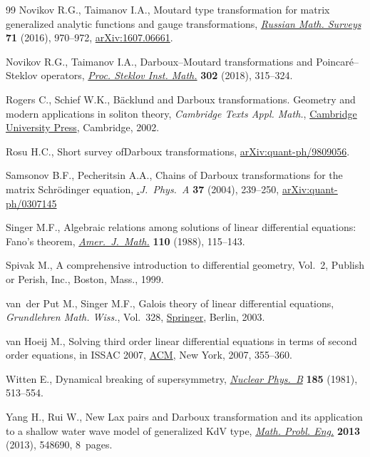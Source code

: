 \documentclass[pdftex]{sigma}%
\numberwithin{equation}{section}
\begin{document}
\begin{thebibliography}{99}
Novikov R.G., Taimanov I.A., {M}outard type transformation for matrix
 generalized analytic functions and gauge transformations, \href{https://doi.org/10.1070/RM9741}{\textit{Russian
 Math. Surveys}} \textbf{71} (2016), 970--972, \href{https://arxiv.org/abs/1607.06661}{arXiv:1607.06661}.

Novikov R.G., Taimanov I.A., Darboux--{M}outard transformations and
 {P}oincar\'e--{S}teklov operators, \href{https://doi.org/10.1134/S0081543818060160}{\textit{Proc. Steklov Inst. Math.}}
 \textbf{302} (2018), 315--324.

Rogers C., Schief W.K., B\"acklund and {D}arboux transformations. {G}eometry
 and modern applications in soliton theory, \textit{Cambridge Texts Appl. Math.}, \href{https://doi.org/10.1017/CBO9780511606359}{Cambridge University Press}, Cambridge, 2002.

Rosu H.C., Short survey of{D}arboux transformations, \href{https://arxiv.org/abs/quant-ph/9809056}{arXiv:quant-ph/9809056}.

Samsonov B.F., Pecheritsin A.A., Chains of {D}arboux transformations for the
 matrix {S}chr\"odinger equation, \href{https://doi.org/10.1088/0305-4470/37/1/016}.{\textit{J.~Phys.~A}} \textbf{37} (2004),
 239--250, \href{https://arxiv.org/abs/quant-ph/0307145}{arXiv:quant-ph/0307145}

Singer M.F., Algebraic relations among solutions of linear differential
 equations: {F}ano's theorem, \href{https://doi.org/10.2307/2374541}{\textit{Amer.~J.~Math.}} \textbf{110} (1988),
 115--143.

Spivak M., A comprehensive introduction to differential geometry, {V}ol.~2,
 Publish or Perish, Inc., Boston, Mass., 1999.

van~der Put M., Singer M.F., Galois theory of linear differential equations,
 \textit{Grundlehren Math. Wiss.}, Vol.~328, \href{https://doi.org/10.1007/978-3-642-55750-7}{Springer}, Berlin, 2003.

van Hoeij M., Solving third order linear differential equations in terms of
 second order equations, in I{SSAC} 2007, \href{https://doi.org/10.1145/1277548.1277596}{ACM}, New York, 2007, 355--360.

Witten E., Dynamical breaking of supersymmetry, \href{https://doi.org/10.1016/0550-3213(81)90006-7}{\textit{Nuclear Phys.~B}}
 \textbf{185} (1981), 513--554.

Yang H., Rui W., New {L}ax pairs and {D}arboux transformation and its
 application to a shallow water wave model of generalized {K}d{V} type,
 \href{https://doi.org/10.1155/2013/548690}{\textit{Math. Probl. Eng.}} \textbf{2013} (2013), 548690, 8~pages.

\end{thebibliography}\LastPageEnding
\end{document}
